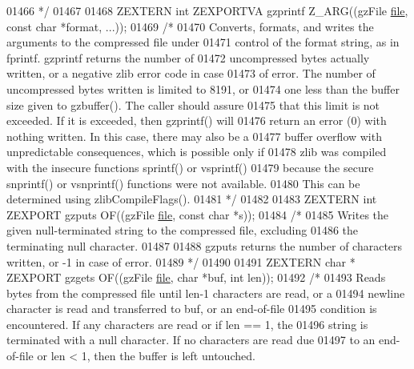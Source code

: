 \begin{DoxyCode}
01466 \textcolor{comment}{*/}
01467 
01468 ZEXTERN \textcolor{keywordtype}{int} ZEXPORTVA gzprintf Z\_ARG((gzFile \hyperlink{structfile}{file}, \textcolor{keyword}{const} \textcolor{keywordtype}{char} *format, ...));
01469 \textcolor{comment}{/*}
01470 \textcolor{comment}{     Converts, formats, and writes the arguments to the compressed file under}
01471 \textcolor{comment}{   control of the format string, as in fprintf.  gzprintf returns the number of}
01472 \textcolor{comment}{   uncompressed bytes actually written, or a negative zlib error code in case}
01473 \textcolor{comment}{   of error.  The number of uncompressed bytes written is limited to 8191, or}
01474 \textcolor{comment}{   one less than the buffer size given to gzbuffer().  The caller should assure}
01475 \textcolor{comment}{   that this limit is not exceeded.  If it is exceeded, then gzprintf() will}
01476 \textcolor{comment}{   return an error (0) with nothing written.  In this case, there may also be a}
01477 \textcolor{comment}{   buffer overflow with unpredictable consequences, which is possible only if}
01478 \textcolor{comment}{   zlib was compiled with the insecure functions sprintf() or vsprintf()}
01479 \textcolor{comment}{   because the secure snprintf() or vsnprintf() functions were not available.}
01480 \textcolor{comment}{   This can be determined using zlibCompileFlags().}
01481 \textcolor{comment}{*/}
01482 
01483 ZEXTERN \textcolor{keywordtype}{int} ZEXPORT gzputs OF((gzFile \hyperlink{structfile}{file}, \textcolor{keyword}{const} \textcolor{keywordtype}{char} *s));
01484 \textcolor{comment}{/*}
01485 \textcolor{comment}{     Writes the given null-terminated string to the compressed file, excluding}
01486 \textcolor{comment}{   the terminating null character.}
01487 \textcolor{comment}{}
01488 \textcolor{comment}{     gzputs returns the number of characters written, or -1 in case of error.}
01489 \textcolor{comment}{*/}
01490 
01491 ZEXTERN \textcolor{keywordtype}{char} * ZEXPORT gzgets OF((gzFile \hyperlink{structfile}{file}, \textcolor{keywordtype}{char} *buf, \textcolor{keywordtype}{int} len));
01492 \textcolor{comment}{/*}
01493 \textcolor{comment}{     Reads bytes from the compressed file until len-1 characters are read, or a}
01494 \textcolor{comment}{   newline character is read and transferred to buf, or an end-of-file}
01495 \textcolor{comment}{   condition is encountered.  If any characters are read or if len == 1, the}
01496 \textcolor{comment}{   string is terminated with a null character.  If no characters are read due}
01497 \textcolor{comment}{   to an end-of-file or len < 1, then the buffer is left untouched.}

\end{DoxyCode}
